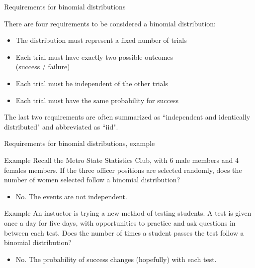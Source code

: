 \documentclass[xcolor=table, aspectratio=169, bigger, handout]{beamer}
\begin{document}
\begin{frame}{Requirements for binomial distributions}
\begin{block}{}
There are four requirements to be considered a binomial distribution:
\begin{itemize}
\pause\item The distribution must represent a fixed number of trials
\pause\item Each trial must have exactly two possible outcomes\\(success / failure)
\pause\item Each trial must be independent of the other trials
\pause\item Each trial must have the same probability for success
\end{itemize}
\pause The last two requirements are often summarized as ``independent and identically distributed" and abbreviated as ``iid".
\end{block}
\end{frame}

\begin{frame}{Requirements for binomial distributions, example}
\begin{exampleblock}{Example}
Recall the Metro State Statistics Club, with 6 male members and 4 females members. If the three officer positions are selected randomly, does the number of women selected follow a binomial distribution?
\begin{itemize}
\pause\item No. The events are not independent.
\end{itemize}
\end{exampleblock}
\pause
\begin{exampleblock}{Example}
An instuctor is trying a new method of testing students. A test is given once a day for five days, with opportunities to practice and ask questions in between each test. Does the number of times a student passes the test follow a binomial distribution?
\begin{itemize}
\pause\item No. The probability of success changes (hopefully) with each test.
\end{itemize}
\end{exampleblock}

\end{frame}
\end{document}
